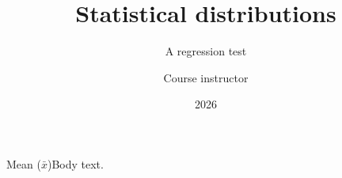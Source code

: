 \documentclass[14pt,t]{beamer-accessibility}
\title{Statistical distributions}
\subtitle{A regression test}
\author{Course instructor}
\date{2026}
\begin{document}
\begin{frame}\titlepage\end{frame}
\begin{frame}{Mean ($\bar{x}$)}Body text.\end{frame}
\end{document}
